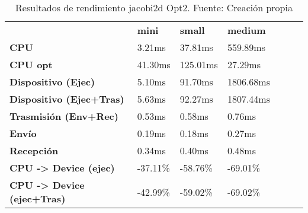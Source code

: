 \begin{table}[H]
    \centering
    \begin{tabular}{lllllll}
    \rowcolor[HTML]{DAE8FC} \ &  \textbf{mini} &  \textbf{	small} &  \textbf{	medium} \\
    \cellcolor[HTML]{DAE8FC} \textbf{CPU} & 3.21ms & 	37.81ms & 	559.89ms \\
    \rowcolor[HTML]{EFEFEF} \cellcolor[HTML]{DAE8FC} \textbf{CPU opt} & 41.30ms & 	125.01ms & 	27.29ms \\
    \cellcolor[HTML]{DAE8FC} \textbf{Dispositivo (Ejec)} & 5.10ms & 	91.70ms & 	1806.68ms \\
    \rowcolor[HTML]{EFEFEF} \cellcolor[HTML]{DAE8FC} \textbf{Dispositivo (Ejec+Tras)} & 5.63ms & 	92.27ms & 	1807.44ms \\
    \cellcolor[HTML]{DAE8FC} \textbf{Trasmisión (Env+Rec)} & 0.53ms & 	0.58ms & 	0.76ms \\
    \rowcolor[HTML]{EFEFEF} \cellcolor[HTML]{DAE8FC} \textbf{Envío} & 0.19ms & 	0.18ms & 	0.27ms \\
    \cellcolor[HTML]{DAE8FC} \textbf{Recepción} & 0.34ms & 	0.40ms & 	0.48ms \\
    \rowcolor[HTML]{EFEFEF} \cellcolor[HTML]{DAE8FC} \textbf{CPU -> Device (ejec)} & -37.11\% & 	-58.76\% & 	-69.01\% \\
    \cellcolor[HTML]{DAE8FC} \textbf{CPU -> Device (ejec+Tras)} & -42.99\% & 	-59.02\% & 	-69.02\% \\
    \end{tabular}
    \caption[Resultados de rendimiento jacobi2d Opt2]{{Resultados de rendimiento jacobi2d Opt2. Fuente: Creación propia}}
    \label{table_test_jacobi2d_Opt2_hw_performanceResults}
\end{table}